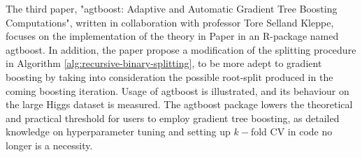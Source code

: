 The third paper, "agtboost: Adaptive and Automatic Gradient Tree Boosting Computations", written in collaboration with professor Tore Selland Kleppe, focuses
on the implementation of the theory in Paper  in an R-package named agtboost. 
In addition, the paper propose a modification of the splitting procedure in Algorithm \ref{alg:recursive-binary-splitting}, to be more adept to gradient boosting by taking into consideration the possible root-split produced in the coming boosting iteration.
Usage of agtboost is illustrated, and its behaviour on the large Higgs dataset is measured.
The agtboost package lowers the theoretical and practical threshold for users to employ gradient tree boosting, as detailed knowledge on hyperparameter tuning and setting up $k-$fold CV in code no longer is a necessity.